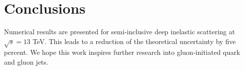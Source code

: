 \section{Conclusions}\label{sec:conclusions}

Numerical results are presented for semi-inclusive deep inelastic
scattering at $\sqrt{s} = 13$ TeV. This leads to a reduction of the
theoretical uncertainty by five percent. We hope this work inspires
further research into gluon-initiated quark and gluon jets.

